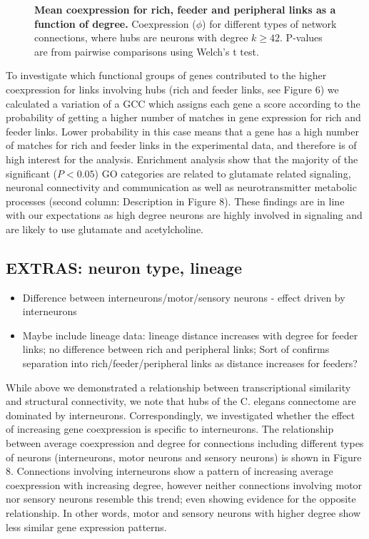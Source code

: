 \documentclass[10pt,letterpaper]{article}
\begin{document}
\begin{figure}[!h]
 \caption{{\bf Mean coexpression for rich, feeder and peripheral links as a function of degree.}
Coexpression ($\phi$) for different types of network connections, where hubs are neurons with degree $k \geq 42$. P-values are from pairwise comparisons using Welch’s t test.}
 \label{ViolinPlots}
 \end{figure}


To investigate which functional groups of genes contributed to the higher coexpression for links involving hubs (rich and feeder links, see Figure 6) we calculated a variation of a GCC which assigns each gene a score according to the probability of getting a higher number of matches in gene expression for rich and feeder links.
Lower probability in this case means that a gene has a high number of matches for rich and feeder links in the experimental data, and therefore is of high interest for the analysis.
Enrichment analysis show that the majority of the significant ($P < 0.05$) GO categories are related to glutamate related signaling, neuronal connectivity and communication as well as neurotransmitter metabolic processes (second column: Description in Figure 8).
These findings are in line with our expectations as high degree neurons are highly involved in signaling and are likely to use glutamate and acetylcholine.

\subsection*{EXTRAS: neuron type, lineage}
\begin{itemize}
    \item{Difference between interneurons/motor/sensory neurons - effect driven by interneurons}
    \item{Maybe include lineage data: lineage distance increases with degree for feeder links; no difference between rich and peripheral links; Sort of confirms separation into rich/feeder/peripheral links as distance increases for feeders?}
\end{itemize} 

While above we demonstrated a relationship between transcriptional similarity and structural connectivity, we note that hubs of the C. elegans connectome are dominated by interneurons.
Correspondingly, we investigated whether the effect of increasing gene coexpression is specific to interneurons.
The relationship between average coexpression and degree for connections including different types of neurons (interneurons, motor neurons and sensory neurons) is shown in Figure 8.
Connections involving interneurons show a pattern of increasing average coexpression with increasing degree, however neither connections involving motor nor sensory neurons resemble this trend; even showing evidence for the opposite relationship.
In other words, motor and sensory neurons with higher degree show less similar gene expression patterns.
\end{document}
